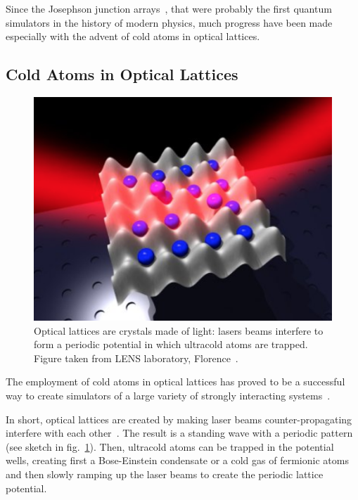 Since the Josephson junction arrays~\cite{josephsonArrays}, that were probably the first quantum simulators in the history of modern physics, much progress have been made especially with the advent of cold atoms in optical lattices.

\subsection{Cold Atoms in Optical Lattices}
\begin{figure}
    \centering
    \includegraphics[scale=0.7]{Figures/optical_lattice.png}
    \captionsetup{width=1.\linewidth}
    \caption{Optical lattices are crystals made of light: lasers beams interfere to form a periodic potential in which ultracold atoms are trapped. Figure taken from LENS laboratory, Florence~\cite{LENS_Florence}.}
    \label{fig:optical_lattice}
\end{figure}

The employment of cold atoms in optical lattices has proved to be a successful way to create simulators of a large variety of strongly interacting systems~\cite{ultracoldAtoms_condMatter}. 

In short, optical lattices are created by making laser beams counter-propagating interfere with each other~\cite{optical_lattice_interview}. The result is a standing wave with a periodic pattern (see sketch in fig.~\ref{fig:optical_lattice}). Then, ultracold atoms can be trapped in the potential wells, creating first a Bose-Einstein condensate or a cold gas of fermionic atoms and then slowly ramping up the laser beams to create the periodic lattice potential. 

